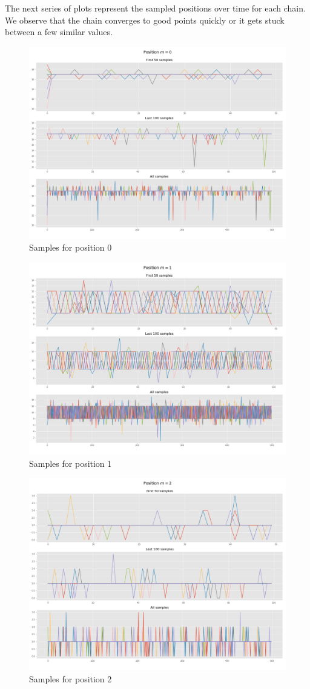 \documentclass[]{article}
\begin{document}
	The next series of plots represent the sampled positions over time for each chain.
	We observe that the chain converges to good points quickly or it gets stuck between a few similar values. 
	
	\begin{figure}[H]
		\begin{center}
			
			\includegraphics[width=.5\textwidth]{task4/figures/T_2_4/Q2/convergence_pos0.png}
			\caption*{Samples for position 0}
		\end{center}
	\end{figure}
	
	\begin{figure}[H]
		\begin{center}
			
			\includegraphics[width=.5\textwidth]{task4/figures/T_2_4/Q2/convergence_pos1.png}
			\caption*{Samples for position 1}
		\end{center}
	\end{figure}
	
	\begin{figure}[H]
		\begin{center}
			
			\includegraphics[width=.5\textwidth]{task4/figures/T_2_4/Q2/convergence_pos2.png}
			\caption*{Samples for position 2}
		\end{center}
	\end{figure}
	
\end{document}
